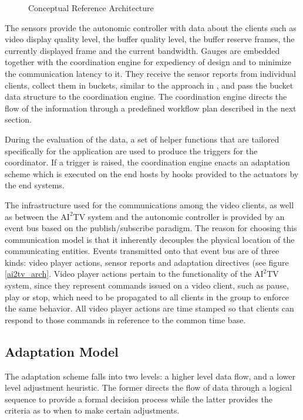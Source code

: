 \documentclass{sig-alternate}
\begin{document}
%
%

\begin{figure}
 \centering
  \label{refarch}
 \caption{Conceptual Reference Architecture}
\end{figure}


The sensors provide the autonomic controller with data about the
clients such as video display quality level, the buffer quality level,
the buffer reserve frames, the currently displayed frame and the
current bandwidth.  Gauges are embedded together with the coordination
engine for expediency of design and to minimize the communication
latency to it.  They receive the sensor reports from individual
clients, collect them in buckets, similar to the approach in
\cite{MIMAZE}, and pass the bucket data structure to the coordination
engine.  The coordination engine directs the flow of the information
through a predefined workflow plan described in the next section.

During the evaluation of the data, a set of helper functions that are
tailored specifically for the application are used to produce the
triggers for the coordinator.  If a trigger is raised, the
coordination engine enacts an adaptation scheme which is executed on
the end hosts by hooks provided to the actuators by the end systems.

The infrastructure used for the communications among the video
clients, as well as between the $\mathrm{AI}^2$TV system and the
autonomic controller is provided by an event bus based on the
publish/subscribe paradigm.  The reason for choosing this
communication model is that it inherently decouples the physical
location of the communicating entities.  Events transmitted onto that
event bus are of three kinds: video player actions, sensor reports and
adaptation directives (see figure \ref{ai2tv_arch}.  Video player
actions pertain to the functionality of the $\mathrm{AI}^2$TV system,
since they represent commands issued on a video client, such as pause,
play or stop, which need to be propagated to all clients in the group
to enforce the same behavior.  All video player actions are time
stamped so that clients can respond to those commands in reference to
the common time base.

\subsection{Adaptation Model}

The adaptation scheme falls into two levels: a higher level data flow,
and a lower level adjustment heuristic.  The former directs the flow
of data through a logical sequence to provide a formal decision
process while the latter provides the criteria as to when to make
certain adjustments.
\end{document}
